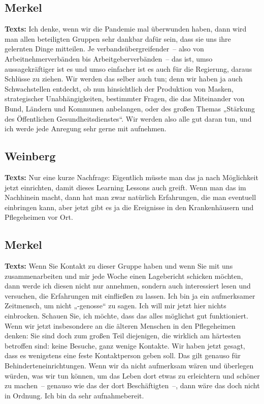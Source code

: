 \documentclass{article}
\begin{document}
\subsection{Merkel}
\noindent\textbf{Texts:} Ich denke, wenn wir die Pandemie mal überwunden haben, dann wird man allen beteiligten Gruppen sehr dankbar dafür sein, dass sie uns ihre gelernten Dinge mitteilen. Je verbandsübergreifender – also von Arbeitnehmerverbänden bis Arbeitgeberverbänden – das ist, umso aussagekräftiger ist es und umso einfacher ist es auch für die Regierung, daraus Schlüsse zu ziehen. Wir werden das selber auch tun; denn wir haben ja auch Schwachstellen entdeckt, ob nun hinsichtlich der Produktion von Masken, strategischer Unabhängigkeiten, bestimmter Fragen, die das Miteinander von Bund, Ländern und Kommunen anbelangen, oder des großen Themas „Stärkung des Öffentlichen Gesundheitsdienstes“. Wir werden also alle gut daran tun, und ich werde jede Anregung sehr gerne mit aufnehmen.

\subsection{Weinberg}
\noindent\textbf{Texts:} Nur eine kurze Nachfrage: Eigentlich müsste man das ja nach Möglichkeit jetzt einrichten, damit dieses Learning Lessons auch greift. Wenn man das im Nachhinein macht, dann hat man zwar natürlich Erfahrungen, die man eventuell einbringen kann, aber jetzt gibt es ja die Ereignisse in den Krankenhäusern und Pflegeheimen vor Ort.

\subsection{Merkel}
\noindent\textbf{Texts:} Wenn Sie Kontakt zu dieser Gruppe haben und wenn Sie mit uns zusammenarbeiten und mir jede Woche einen Lagebericht schicken möchten, dann werde ich diesen nicht nur annehmen, sondern auch interessiert lesen und versuchen, die Erfahrungen mit einfließen zu lassen. Ich bin ja ein aufmerksamer Zeitmensch, um nicht „-genosse“ zu sagen.  Ich will mir jetzt hier nichts einbrocken. Schauen Sie, ich möchte, dass das alles möglichst gut funktioniert. Wenn wir jetzt insbesondere an die älteren Menschen in den Pflegeheimen denken: Sie sind doch zum großen Teil diejenigen, die wirklich am härtesten betroffen sind:  keine Besuche, ganz wenige Kontakte. Wir haben jetzt gesagt, dass es wenigstens eine feste Kontaktperson geben soll. Das gilt genauso für Behinderteneinrichtungen. Wenn wir da nicht aufmerksam wären und überlegen würden, was wir tun können, um das Leben dort etwas zu erleichtern und schöner zu machen – genauso wie das der dort Beschäftigten –, dann wäre das doch nicht in Ordnung. Ich bin da sehr aufnahmebereit.
\end{document}
